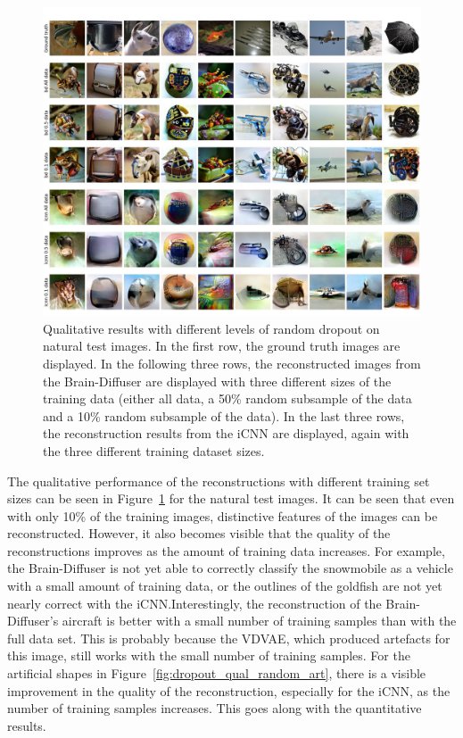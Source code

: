 \begin{figure}[H]
  \centering
  \includegraphics[width=1\textwidth]{plots/dropout_qual_random_test.JPEG}
  \caption[Qualitative results random dropout on natural test images]{Qualitative results with different levels of random dropout on natural test images. In the first row, the ground truth images are displayed. In the following three rows, the reconstructed images from the Brain-Diffuser are displayed with three different sizes of the training data (either all data, a 50\% random subsample of the data and a 10\% random subsample of the data). In the last three rows, the reconstruction results from the iCNN are displayed, again with the three different training dataset sizes.}\label{fig:dropout_qual_random_test}
\end{figure}

The qualitative performance of the reconstructions with different training set sizes can be seen in Figure~\ref{fig:dropout_qual_random_test} for the natural test images. It can be seen that even with only 10\% of the training images, distinctive features of the images can be reconstructed. However, it also becomes visible that the quality of the reconstructions improves as the amount of training data increases. For example, the Brain-Diffuser is not yet able to correctly classify the snowmobile as a vehicle with a small amount of training data, or the outlines of the goldfish are not yet nearly correct with the iCNN.\@ Interestingly, the reconstruction of the Brain-Diffuser's aircraft is better with a small number of training samples than with the full data set. This is probably because the VDVAE, which produced artefacts for this image, still works with the small number of training samples. For the artificial shapes in Figure~\ref{fig:dropout_qual_random_art}, there is a visible improvement in the quality of the reconstruction, especially for the iCNN, as the number of training samples increases. This goes along with the quantitative results.

